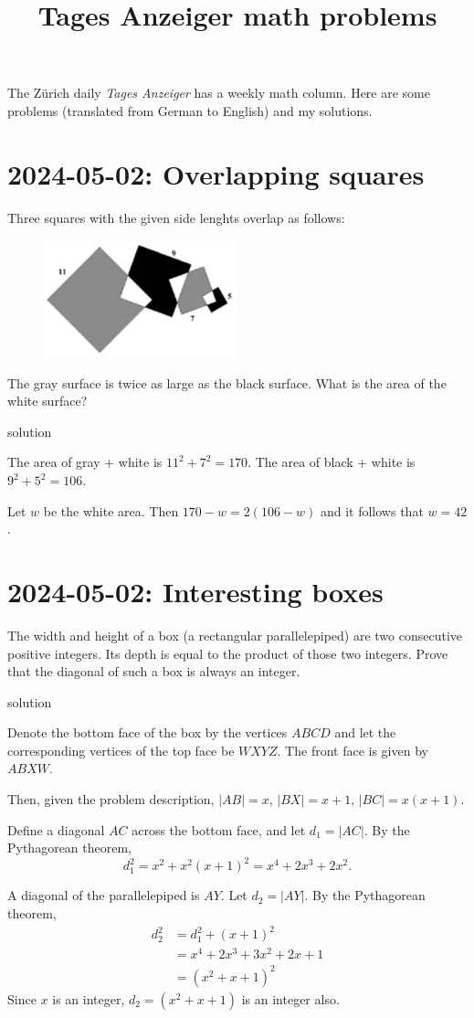 \documentclass[11pt, oneside]{amsart}
\title{Tages Anzeiger math problems}
\newcommand{\problem}[2]{\section*{#1: #2}}
\newcommand{\solution}[0]{{\sc solution}}
\begin{document}
\maketitle

The Zürich daily {\em Tages Anzeiger} has a weekly math column. Here are some
problems (translated from German to English) and my solutions.

\problem{2024-05-02}{Overlapping squares}

Three squares with the given side lenghts overlap as follows:

\begin{figure}[!h] 
    \centering
    \includegraphics[width=0.5\textwidth]{squares.png}
\end{figure}

The gray surface is twice as large as the black surface. What is the area of the white surface?

\solution

The area of gray + white is $11^2 + 7^2 = 170$. The area of black + white is $9^2+5^2 = 106$.

Let $w$ be the white area. Then $170 - w =  2(106-w)$ and it follows that $w = 42$.

\newpage
\problem{2024-05-02}{Interesting boxes}

The width and height of a box (a rectangular parallelepiped) are two consecutive
positive integers. Its depth is equal to the product of those two integers.
Prove that the diagonal of such a box is always an integer.

\solution

Denote the bottom face of the box by the vertices $ABCD$ and let the corresponding
vertices of the top face be $WXYZ$. The front face is given by $ABXW$.

Then, given the problem description, $|AB| = x$, $|BX| = x+1$, $|BC| = x(x+1)$.

Define a diagonal $AC$ across the bottom face, and let $d_1 = |AC|$.
By the Pythagorean theorem,
\[ d_1^2 = x^2 + x^2(x+1)^2 = x^4 + 2x^3 + 2x^2. \]

A diagonal of the parallelepiped is $AY$. Let $d_2 = |AY|$.
By the Pythagorean theorem,
\begin{align*}
	 d_2^2 &= d_1^2 + (x+1)^2 \\
           &= x^4 + 2x^3 + 3x^2 + 2x + 1 \\
           &= (x^2 + x + 1)^2
\end{align*}
Since $x$ is an integer, $d_2 = (x^2 + x +1)$ is an integer also.
\end{document}
